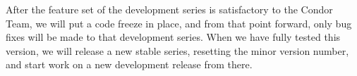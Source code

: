 After the feature set of the development series is satisfactory to the
Condor Team, we will put a code freeze in place, and from that point
forward, only bug fixes will be made to that development series.
When we have fully tested this version, we will release a new stable
series, resetting the minor version number, and start work on a new
development release from there.









